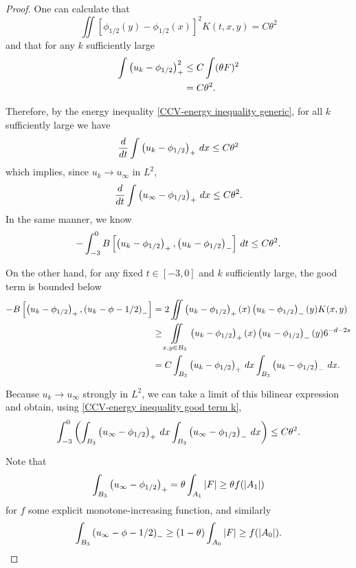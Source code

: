 \begin{proof}
One can calculate that
\[ \iint [\phi_{1/2}(y)-\phi_{1/2}(x)]^2 K(t,x,y) = C \theta^2  \]
and that for any $k$ sufficiently large
\begin{align*} 
\int \left( u_k-\phi_{1/2} \right)_+^2 &\leq C \int (\theta F)^2
\\ &= C \theta^2.
\end{align*}

Therefore, by the energy inequality \eqref{CCV-energy inequality generic}, for all $k$ sufficiently large we have
\[ \frac{d}{dt} \int \left( u_k-\phi_{1/2} \right)_+ \,dx \leq C \theta^2 \]
which implies, since $u_k \to u_\infty$ in $L^2$,
\begin{equation} \label{CCV-derivative bound limit} 
\frac{d}{dt} \int \left( u_\infty-\phi_{1/2} \right)_+ \,dx \leq C \theta^2.
\end{equation}
In the same manner, we know
\begin{equation} \label{CCV-energy inequality good term k}
- \int_{-3}^0 B\left[ \left( u_k-\phi_{1/2} \right)_+, \left( u_k-\phi_{1/2} \right)_- \right] \,dt \leq C \theta^2.
\end{equation}

On the other hand, for any fixed $t \in [-3,0]$ and $k$ sufficiently large, the good term is bounded below
\begin{align*} 
-B\left[ \left( u_k-\phi_{1/2} \right)_+, \left( u_k-\phi-{1/2} \right)_- \right] &= 2 \iint \left( u_k-\phi_{1/2} \right)_+(x) \left( u_k-\phi_{1/2} \right)_-(y) K(x,y)
\\ & \geq \iint\limits_{x,y \in B_3} \left( u_k-\phi_{1/2} \right)_+(x) \left( u_k-\phi_{1/2} \right)_-(y) 6^{-d-2s}
\\ &= C \int_{B_3} \left( u_k-\phi_{1/2} \right)_+ \,dx \int_{B_3} \left( u_k-\phi_{1/2} \right)_- \,dx.  
\end{align*}

Because $u_k \to u_\infty$ strongly in $L^2$, we can take a limit of this bilinear expression and obtain, using \eqref{CCV-energy inequality good term k},
\begin{equation}
\int_{-3}^0 \left(  \int_{B_3} \left( u_\infty-\phi_{1/2} \right)_+ \,dx \int_{B_3} \left( u_\infty-\phi_{1/2} \right)_- \,dx \right) \leq C \theta^2.  
\end{equation} 

Note that
\[ \int_{B_3} \left( u_\infty-\phi_{1/2} \right)_+ = \theta \int_{A_1} |F| \geq \theta f(|A_1|) \]
for $f$ some explicit monotone-increasing function, and similarly
\[ \int_{B_3} \left( u_\infty-\phi-{1/2} \right)_- \geq (1-\theta) \int_{A_0} |F| \geq f(|A_0|). \]


\end{proof}
